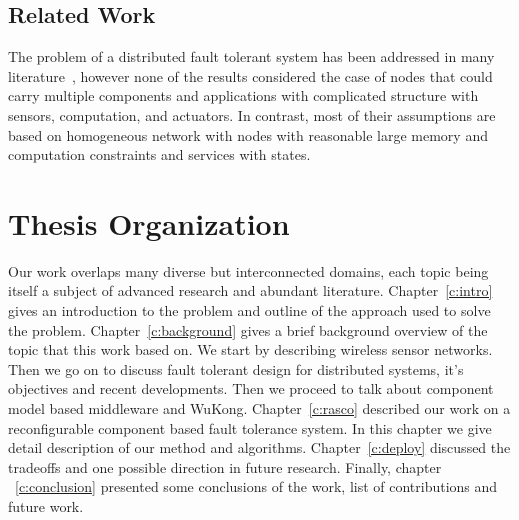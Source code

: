 \subsection{Related Work}

The problem of a distributed fault tolerant system has been addressed in many
literature~\cite{Neumann2010,Lamport2001,Luna2008,Liu2009,Sussman2000,Lynch2002},
however none of the results considered the case of nodes that could carry
multiple components and applications with complicated structure with sensors,
computation, and actuators. In contrast, most of their assumptions
are based on homogeneous network with nodes with reasonable large memory and computation constraints and services with states.

\section{Thesis Organization}

Our work overlaps many diverse but interconnected domains, each topic being 
itself a subject of advanced research and abundant literature.
Chapter~\ref{c:intro} gives an introduction to the problem and outline of the
approach used to solve the problem. Chapter~\ref{c:background}
gives a brief background overview of the topic that this work based on. 
We start by describing wireless sensor networks. Then we go on to discuss fault
tolerant design for distributed systems, it's objectives and recent
developments. Then we proceed to talk about component model based middleware and WuKong. Chapter~\ref{c:rasco} described our work on a reconfigurable component 
based fault tolerance system. In this chapter we give detail description of our method and algorithms.%
Chapter~\ref{c:deploy} discussed the tradeoffs and one possible direction in future research. Finally, chapter ~\ref{c:conclusion} presented some conclusions of the work, list of contributions and future work.
